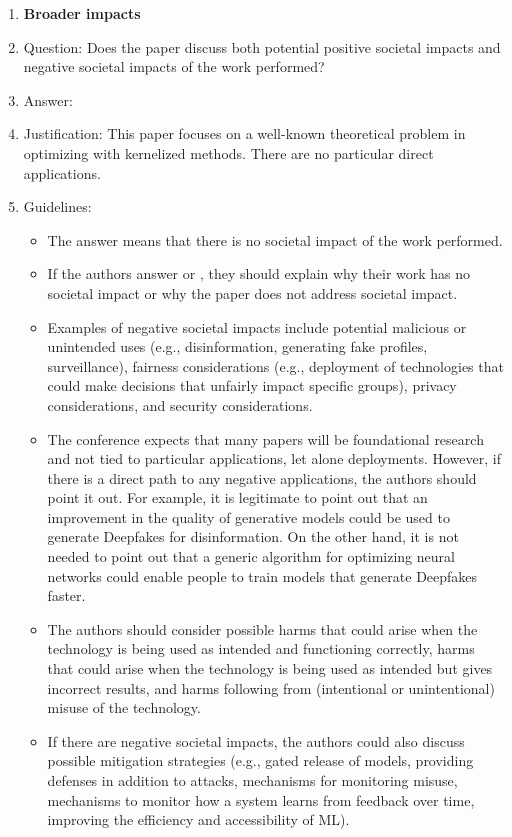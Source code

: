 \documentclass{article}
\numberwithin{theorem}{section}
\theoremstyle{definition}
\begin{document}
\begin{enumerate}
\item {\bf Broader impacts}
    \item[] Question: Does the paper discuss both potential positive societal impacts and negative societal impacts of the work performed?
    \item[] Answer: \answerNA{} %
    \item[] Justification: This paper focuses on a well-known theoretical problem in optimizing with kernelized methods. There are no particular direct applications.
    \item[] Guidelines:
    \begin{itemize}
        \item The answer \answerNA{} means that there is no societal impact of the work performed.
        \item If the authors answer \answerNA{} or \answerNo, they should explain why their work has no societal impact or why the paper does not address societal impact.
        \item Examples of negative societal impacts include potential malicious or unintended uses (e.g., disinformation, generating fake profiles, surveillance), fairness considerations (e.g., deployment of technologies that could make decisions that unfairly impact specific groups), privacy considerations, and security considerations.
        \item The conference expects that many papers will be foundational research and not tied to particular applications, let alone deployments. However, if there is a direct path to any negative applications, the authors should point it out. For example, it is legitimate to point out that an improvement in the quality of generative models could be used to generate Deepfakes for disinformation. On the other hand, it is not needed to point out that a generic algorithm for optimizing neural networks could enable people to train models that generate Deepfakes faster.
        \item The authors should consider possible harms that could arise when the technology is being used as intended and functioning correctly, harms that could arise when the technology is being used as intended but gives incorrect results, and harms following from (intentional or unintentional) misuse of the technology.
        \item If there are negative societal impacts, the authors could also discuss possible mitigation strategies (e.g., gated release of models, providing defenses in addition to attacks, mechanisms for monitoring misuse, mechanisms to monitor how a system learns from feedback over time, improving the efficiency and accessibility of ML).
    \end{itemize}
    

\end{enumerate}
\end{document}
